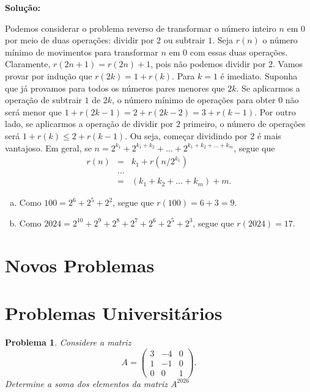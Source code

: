 \documentclass{hipatia}
\newtheorem{problem*}{Problema}
\begin{document}
\noindent \textbf{Solução:}

\noindent Podemos considerar o problema reverso de transformar o número inteiro $n$ em $0$ por meio de duas operações: dividir por $2$ ou subtrair $1$. Seja $r(n)$ o número mínimo de movimentos para transformar $n$ em $0$ com essas duas operações. Claramente, $r(2n+1) = r(2n) + 1$, pois não podemos dividir por $2$. Vamos provar por indução que $r(2k) = 1 + r(k)$. Para $k = 1$ é imediato. Suponha que já provamos para todos os números pares menores que $2k$. Se aplicarmos a operação de subtrair $1$ de $2k$, o número mínimo de operações para obter $0$ não será menor que $1 + r(2k-1) = 2 + r(2k-2) = 3 + r(k-1)$. Por outro lado, se aplicarmos a operação de dividir por $2$ primeiro, o número de operações será $1 + r(k) \leq 2 + r(k-1)$. Ou seja, começar dividindo por $2$ é mais vantajoso. Em geral, se $n = 2^{k_1} + 2^{k_1+k_2} + \ldots + 2^{k_1+k_2+\ldots+k_m}$, segue que 
\begin{eqnarray*}
r(n) & = & k_1 + r(n/2^{k_1}) \\
     & \ldots  & \\
    & = & (k_1 + k_2 + \ldots + k_m) + m.
\end{eqnarray*}

\begin{enumerate}[a)]
\item Como $100 = 2^6 + 2^5 + 2^2$, segue que $r(100) = 6 + 3 = 9$.
\item Como $2024 = 2^{10} + 2^9 + 2^8 + 2^7 + 2^6 + 2^5 + 2^3$, segue que $r(2024) = 17$.
\end{enumerate}




\section{Novos Problemas}



\section*{Problemas Universitários}

\begin{problem*}
Considere a matriz 
\[
A = \begin{pmatrix} 3 & -4 & 0 \\ 1 & -1 & 0 \\ 0 & 0 & 1 \end{pmatrix}.
\] 
Determine a soma dos elementos da matriz \(A^{2026}\)
\end{problem*}
\end{document}
